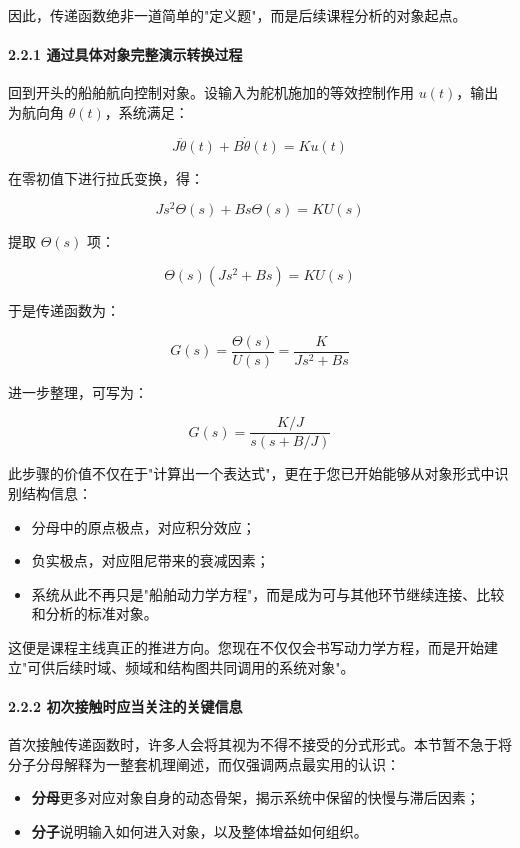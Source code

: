 \documentclass[
  11pt]{article}
\providecommand{\tightlist}{%
  \setlength{\itemsep}{0pt}\setlength{\parskip}{0pt}}
\begin{document}
因此，传递函数绝非一道简单的"定义题"，而是后续课程分析的对象起点。

\paragraph{2.2.1
通过具体对象完整演示转换过程}\label{ux901aux8fc7ux5177ux4f53ux5bf9ux8c61ux5b8cux6574ux6f14ux793aux8f6cux6362ux8fc7ux7a0b}

回到开头的船舶航向控制对象。设输入为舵机施加的等效控制作用
\(u(t)\)，输出为航向角 \(\theta(t)\)，系统满足：

\[
J\ddot{\theta}(t)+B\dot{\theta}(t)=Ku(t)
\]

在零初值下进行拉氏变换，得：

\[
Js^2\Theta(s)+Bs\Theta(s)=KU(s)
\]

提取 \(\Theta(s)\) 项：

\[
\Theta(s)\left(Js^2+Bs\right)=KU(s)
\]

于是传递函数为：

\[
G(s)=\frac{\Theta(s)}{U(s)}=\frac{K}{Js^2+Bs}
\]

进一步整理，可写为：

\[
G(s)=\frac{K/J}{s\left(s+B/J\right)}
\]

此步骤的价值不仅在于"计算出一个表达式"，更在于您已开始能够从对象形式中识别结构信息：

\begin{itemize}
\tightlist
\item
  分母中的原点极点，对应积分效应；
\item
  负实极点，对应阻尼带来的衰减因素；
\item
  系统从此不再只是"船舶动力学方程"，而是成为可与其他环节继续连接、比较和分析的标准对象。
\end{itemize}

这便是课程主线真正的推进方向。您现在不仅仅会书写动力学方程，而是开始建立"可供后续时域、频域和结构图共同调用的系统对象"。

\paragraph{2.2.2
初次接触时应当关注的关键信息}\label{ux521dux6b21ux63a5ux89e6ux65f6ux5e94ux5f53ux5173ux6ce8ux7684ux5173ux952eux4fe1ux606f}

首次接触传递函数时，许多人会将其视为不得不接受的分式形式。本节暂不急于将分子分母解释为一整套机理阐述，而仅强调两点最实用的认识：

\begin{itemize}
\tightlist
\item
  \textbf{分母}更多对应对象自身的动态骨架，揭示系统中保留的快慢与滞后因素；
\item
  \textbf{分子}说明输入如何进入对象，以及整体增益如何组织。
\end{itemize}
\end{document}
